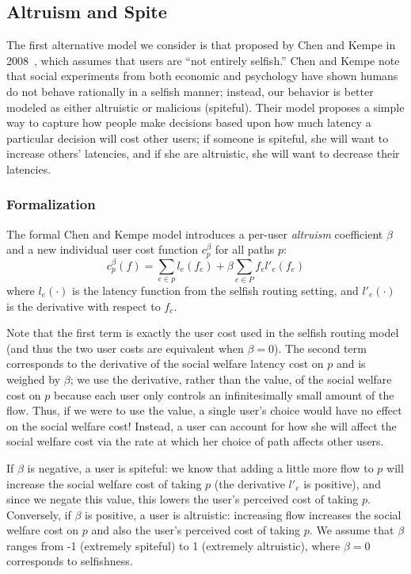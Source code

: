\subsection{Altruism and Spite}
The first alternative model we consider is that proposed by Chen and Kempe in 2008~\cite{chen}, which assumes that users are ``not entirely selfish.''
Chen and Kempe note that social experiments from both economic and psychology have shown humans do not behave rationally in a selfish manner; instead, our behavior is better modeled as either altruistic or malicious (spiteful).
Their model proposes a simple way to capture how people make decisions based upon how much latency a particular decision will cost other users; if someone is spiteful, she will want to increase others' latencies, and if she are altruistic, she will want to decrease their latencies.

\subsubsection{Formalization}
The formal Chen and Kempe model introduces a per-user \emph{altruism} coefficient $\beta$ and a new individual user cost function
$c^\beta_p$ for all paths $p$: 
$$c^\beta_p(f) = \sum_{e \in p} l_e(f_e) + \beta\sum_{e\in P} f_el'_e(f_e)$$
where $l_e(\cdot)$ is the latency function from the selfish routing setting, and $l'_e(\cdot)$ is the derivative with respect to $f_e$.

Note that the first term is exactly the user cost used in the selfish routing model (and thus the two user costs are equivalent when $\beta = 0$).
The second term corresponds to the derivative of the social welfare latency cost on $p$ and is weighed by $\beta$; we use the derivative, rather than the value, of the social welfare cost on $p$ because each user only controls an infinitesimally small amount of the flow. Thus, if we were to use the value, a single user's choice would have no effect on the social welfare cost! 
Instead, a user can account for how she will affect the social welfare cost via the rate at which her  choice of path affects other users.

If $\beta$ is negative, a user is spiteful: we know that adding a little more flow to $p$ will increase the social welfare cost of taking $p$ (the derivative $l'_e$ is positive), and since we negate this value, this lowers the user's perceived cost of taking $p$.
Conversely, if $\beta$ is positive, a user is altruistic: increasing flow increases the social welfare cost on $p$ and also the user's perceived cost of taking $p$.
We assume that $\beta$ ranges from -1 (extremely spiteful) to 1 (extremely altruistic), where $\beta=0$ corresponds to selfishness.

